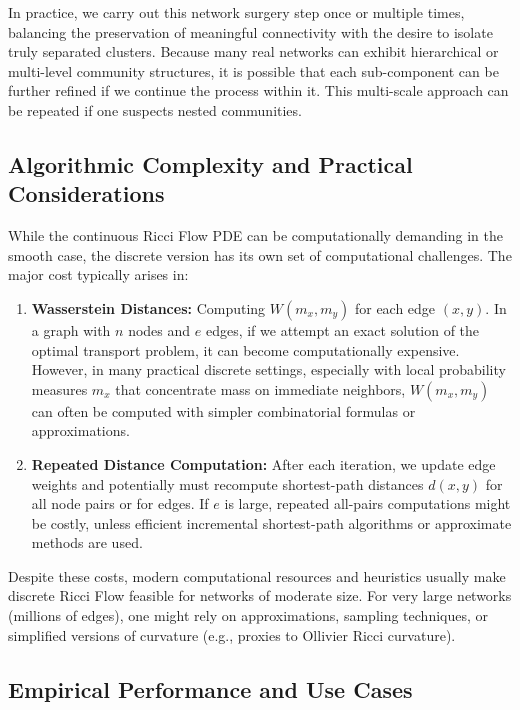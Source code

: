 In practice, we carry out this network surgery step once or multiple times, balancing the preservation of meaningful connectivity with the desire to isolate truly separated clusters. Because many real networks can exhibit hierarchical or multi-level community structures, it is possible that each sub-component can be further refined if we continue the process within it. This multi-scale approach can be repeated if one suspects nested communities.

\subsection{Algorithmic Complexity and Practical Considerations}
\label{subsec:complexity}

While the continuous Ricci Flow PDE can be computationally demanding in the smooth case, the discrete version has its own set of computational challenges. The major cost typically arises in:
\begin{enumerate}
    \item \textbf{Wasserstein Distances:} Computing $W(m_x, m_y)$ for each edge $(x,y)$. In a graph with $n$ nodes and $e$ edges, if we attempt an exact solution of the optimal transport problem, it can become computationally expensive. However, in many practical discrete settings, especially with local probability measures $m_x$ that concentrate mass on immediate neighbors, $W(m_x,m_y)$ can often be computed with simpler combinatorial formulas or approximations. 
    \item \textbf{Repeated Distance Computation:} After each iteration, we update edge weights and potentially must recompute shortest-path distances $d(x,y)$ for all node pairs or for edges. If $e$ is large, repeated all-pairs computations might be costly, unless efficient incremental shortest-path algorithms or approximate methods are used.
\end{enumerate}
Despite these costs, modern computational resources and heuristics usually make discrete Ricci Flow feasible for networks of moderate size. For very large networks (millions of edges), one might rely on approximations, sampling techniques, or simplified versions of curvature (e.g., proxies to Ollivier Ricci curvature).

\subsection{Empirical Performance and Use Cases}
\label{subsec:empirical}

